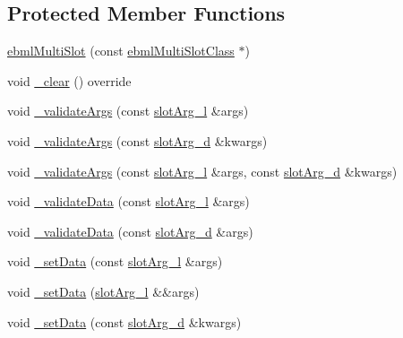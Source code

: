 \subsection*{Protected Member Functions}
\begin{DoxyCompactItemize}
\item 
\mbox{\hyperlink{classebml_1_1ebmlMultiSlot_a736f14f96d3a2f8b288e984113c86c9b}{ebml\+Multi\+Slot}} (const \mbox{\hyperlink{classebml_1_1ebmlMultiSlotClass}{ebml\+Multi\+Slot\+Class}} $\ast$)
\item 
void \mbox{\hyperlink{classebml_1_1ebmlMultiSlot_a0743d6fcdd75068045d53397c97dd2c3}{\+\_\+clear}} () override
\item 
void \mbox{\hyperlink{classebml_1_1ebmlMultiSlot_af6377e38bc00a9ac5a6af007644e0f66}{\+\_\+validate\+Args}} (const \mbox{\hyperlink{namespaceebml_ae432575dfbb3e141ce897442794f0ca5}{slot\+Arg\+\_\+l}} \&args)
\item 
void \mbox{\hyperlink{classebml_1_1ebmlMultiSlot_a96fb07cd63255265521772ce0080c3cb}{\+\_\+validate\+Args}} (const \mbox{\hyperlink{namespaceebml_a4317d4c495715eced3ed448c2d05caeb}{slot\+Arg\+\_\+d}} \&kwargs)
\item 
void \mbox{\hyperlink{classebml_1_1ebmlMultiSlot_ae405c0712f66903b2f05b74132eb1317}{\+\_\+validate\+Args}} (const \mbox{\hyperlink{namespaceebml_ae432575dfbb3e141ce897442794f0ca5}{slot\+Arg\+\_\+l}} \&args, const \mbox{\hyperlink{namespaceebml_a4317d4c495715eced3ed448c2d05caeb}{slot\+Arg\+\_\+d}} \&kwargs)
\item 
void \mbox{\hyperlink{classebml_1_1ebmlMultiSlot_a55c35fb4ca640b362e395515088140eb}{\+\_\+validate\+Data}} (const \mbox{\hyperlink{namespaceebml_ae432575dfbb3e141ce897442794f0ca5}{slot\+Arg\+\_\+l}} \&args)
\item 
void \mbox{\hyperlink{classebml_1_1ebmlMultiSlot_a4c3233d2c54713803d113d6bed9b4663}{\+\_\+validate\+Data}} (const \mbox{\hyperlink{namespaceebml_a4317d4c495715eced3ed448c2d05caeb}{slot\+Arg\+\_\+d}} \&args)
\item 
void \mbox{\hyperlink{classebml_1_1ebmlMultiSlot_a35a5efc5bb9dcc976bec3d4be4303925}{\+\_\+set\+Data}} (const \mbox{\hyperlink{namespaceebml_ae432575dfbb3e141ce897442794f0ca5}{slot\+Arg\+\_\+l}} \&args)
\item 
void \mbox{\hyperlink{classebml_1_1ebmlMultiSlot_a5113a76cfd5de57c83b6ecb2f459d848}{\+\_\+set\+Data}} (\mbox{\hyperlink{namespaceebml_ae432575dfbb3e141ce897442794f0ca5}{slot\+Arg\+\_\+l}} \&\&args)
\item 
void \mbox{\hyperlink{classebml_1_1ebmlMultiSlot_ada5486b817bc70eaaebec2cd80c8ecf1}{\+\_\+set\+Data}} (const \mbox{\hyperlink{namespaceebml_a4317d4c495715eced3ed448c2d05caeb}{slot\+Arg\+\_\+d}} \&kwargs)

\end{DoxyCompactItemize}
